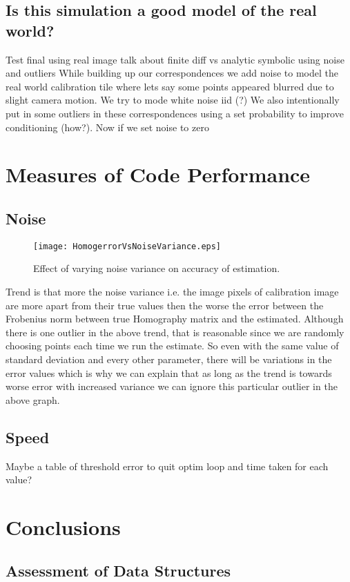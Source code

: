\documentclass[titlepage]{article}
\begin{document}
\subsection{Is this simulation a good model of the real world?}
%
Test final using real image
talk about finite diff vs analytic symbolic
using noise and outliers
While building up our correspondences we add noise to model the real world calibration tile where lets say some points appeared blurred due to slight camera motion. We try to mode white noise iid (?)
We also intentionally put in some outliers in these correspondences using a set probability to improve conditioning (how?).
Now if we set noise to zero 

\section{Measures of Code Performance}
\subsection{Noise}
\begin{wrapfigure}{R}{5.5cm}
\texttt{[image: HomogerrorVsNoiseVariance.eps]}
\caption{Effect of varying noise variance on accuracy of estimation.}
\label{wrap-fig:1}
\end{wrapfigure} 
Trend is that more the noise variance i.e. the image pixels of calibration image are more apart from their true values then the worse the error between the Frobenius norm between true Homography matrix and the estimated. Although there is one outlier in the above trend, that is reasonable since we are randomly choosing points each time we run the estimate. So even with the same value of standard deviation and every other parameter, there will be variations in the error values which is why we can explain that as long as the trend is towards worse error with increased variance we can ignore this particular outlier in the above graph.

\subsection{Speed}
Maybe a table of threshold error to quit optim loop and time taken for each value?



\section{Conclusions}
\subsection{Assessment of Data Structures}
\end{document}
